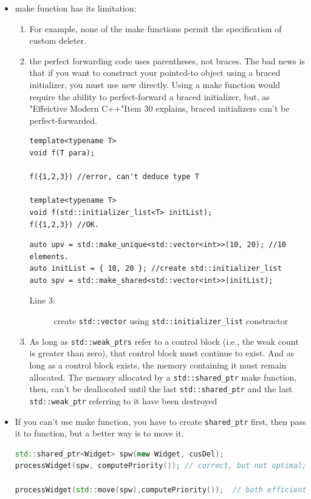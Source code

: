 \documentclass[a4paper,11pt,twoside]{book}
\begin{document}
\begin{itemize}
	\item make function has its limitation:
	\begin{enumerate}
		\item For example, none of the make functions permit the specification of custom deleter.
		
		\item the perfect forwarding code uses parentheses, not braces. The bad news is that if you want to construct your pointed-to object using a braced initializer, you must use new directly. Using a make function would require the ability to perfect-forward a braced initializer, but, as "Effeictive Modern C++"Item 30 explains, braced initializers can't be perfect-forwarded.
\begin{lstlisting}
template<typename T>
void f(T para);

f({1,2,3}) //error, can't deduce type T

template<typename T>
void f(std::initializer_list<T> initList);
f({1,2,3}) //OK.
\end{lstlisting}

\begin{lstlisting}
auto upv = std::make_unique<std::vector<int>>(10, 20); //10 elements. 
auto initList = { 10, 20 }; //create std::initializer_list
auto spv = std::make_shared<std::vector<int>>(initList);
\end{lstlisting}
\begin{description}
	\item[Line 3:] create \texttt{std::vector} using \texttt{std::initializer\_list} constructor
\end{description}
		
		\item As long as \texttt{std::weak\_ptrs} refer to a control block (i.e., the weak count is greater than zero), that control block must continue to exist. And as long as a control block exists, the memory containing it must remain allocated. The memory allocated by a \texttt{std::shared\_ptr} make function, then, can't be deallocated until the last \texttt{std::shared\_ptr} and the last \texttt{std::weak\_ptr} referring to it have been destroyed
	\end{enumerate}
	
	\item If you can't use make function, you have to create \texttt{shared\_ptr} first, then pass it to function, but a better way is to move it.
\begin{lstlisting}[frame=single, language=c++]
std::shared_ptr<Widget> spw(new Widget, cusDel);
processWidget(spw, computePriority()); // correct, but not optimal; 

processWidget(std::move(spw),computePriority());  // both efficient and exception safe
\end{lstlisting}
	
\end{itemize}
\end{document}

